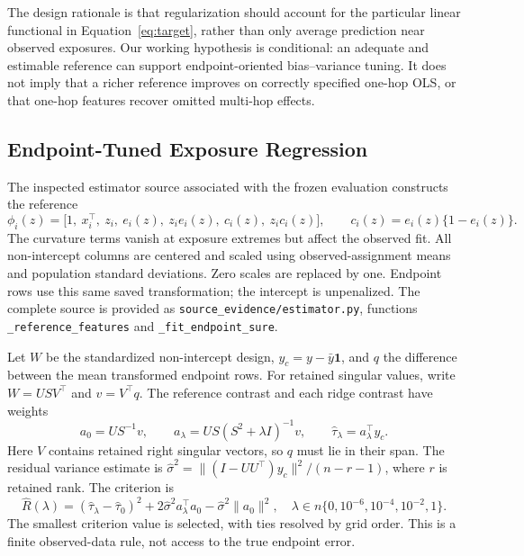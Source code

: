 \documentclass{article}
\newcommand{\gate}{\tau}
\begin{document}
The design rationale is that regularization should account for the particular linear functional in Equation~\ref{eq:target}, rather than only average prediction near observed exposures. Our working hypothesis is conditional: an adequate and estimable reference can support endpoint-oriented bias--variance tuning. It does not imply that a richer reference improves on correctly specified one-hop OLS, or that one-hop features recover omitted multi-hop effects.

\subsection{Endpoint-Tuned Exposure Regression}
The inspected estimator source associated with the frozen evaluation constructs the reference
\begin{equation}
\phi_i(z)=\bigl[1,\ x_i^\top,\ z_i,\ e_i(z),\ z_i e_i(z),\ c_i(z),\ z_i c_i(z)\bigr],
\qquad c_i(z)=e_i(z)\{1-e_i(z)\}.
\label{eq:features}
\end{equation}
The curvature terms vanish at exposure extremes but affect the observed fit. All non-intercept columns are centered and scaled using observed-assignment means and population standard deviations. Zero scales are replaced by one. Endpoint rows use this same saved transformation; the intercept is unpenalized. The complete source is provided as \texttt{source\_evidence/estimator.py}, functions \texttt{\_reference\_features} and \texttt{\_fit\_endpoint\_sure}.

Let $W$ be the standardized non-intercept design, $y_c=y-\bar y\mathbf{1}$, and $q$ the difference between the mean transformed endpoint rows. For retained singular values, write $W=USV^\top$ and $v=V^\top q$. The reference contrast and each ridge contrast have weights
\begin{equation}
a_0=US^{-1}v,\qquad a_\lambda=US(S^2+\lambda I)^{-1}v,\qquad
\widehat\gate_\lambda=a_\lambda^\top y_c.
\label{eq:weights}
\end{equation}
Here $V$ contains retained right singular vectors, so $q$ must lie in their span. The residual variance estimate is $\widehat\sigma^2=\|(I-UU^\top)y_c\|^2/(n-r-1)$, where $r$ is retained rank. The criterion is
\begin{equation}
\widehat R(\lambda)=
(\widehat\gate_\lambda-\widehat\gate_0)^2
+2\widehat\sigma^2 a_\lambda^\top a_0-\widehat\sigma^2\|a_0\|^2,
\quad
\lambda\in n\{0,10^{-6},10^{-4},10^{-2},1\}.
\label{eq:risk}
\end{equation}
The smallest criterion value is selected, with ties resolved by grid order. This is a finite observed-data rule, not access to the true endpoint error.
\end{document}
